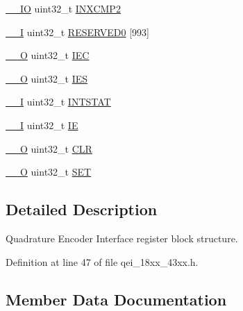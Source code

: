 \begin{DoxyCompactItemize}
\item 
\hyperlink{core__sc300_8h_aec43007d9998a0a0e01faede4133d6be}{\+\_\+\+\_\+\+IO} uint32\+\_\+t \hyperlink{struct_l_p_c___q_e_i___t_a19ba8a85129824ec0259b6733baff660}{I\+N\+X\+C\+M\+P2}
\item 
\hyperlink{core__sc300_8h_af63697ed9952cc71e1225efe205f6cd3}{\+\_\+\+\_\+I} uint32\+\_\+t \hyperlink{struct_l_p_c___q_e_i___t_a4989c1bc50afbce2d2b4e966d2c518a5}{R\+E\+S\+E\+R\+V\+E\+D0} \mbox{[}993\mbox{]}
\item 
\hyperlink{core__sc300_8h_a7e25d9380f9ef903923964322e71f2f6}{\+\_\+\+\_\+O} uint32\+\_\+t \hyperlink{struct_l_p_c___q_e_i___t_ad4164e0990c509994c19caccf1f7cf61}{I\+EC}
\item 
\hyperlink{core__sc300_8h_a7e25d9380f9ef903923964322e71f2f6}{\+\_\+\+\_\+O} uint32\+\_\+t \hyperlink{struct_l_p_c___q_e_i___t_a2eab592cbea507455a7aaab9a5ab6d53}{I\+ES}
\item 
\hyperlink{core__sc300_8h_af63697ed9952cc71e1225efe205f6cd3}{\+\_\+\+\_\+I} uint32\+\_\+t \hyperlink{struct_l_p_c___q_e_i___t_a550a4e26c5e38589e8722dc3064478a5}{I\+N\+T\+S\+T\+AT}
\item 
\hyperlink{core__sc300_8h_af63697ed9952cc71e1225efe205f6cd3}{\+\_\+\+\_\+I} uint32\+\_\+t \hyperlink{struct_l_p_c___q_e_i___t_a89eace37d24d618b12322f0479b3aefd}{IE}
\item 
\hyperlink{core__sc300_8h_a7e25d9380f9ef903923964322e71f2f6}{\+\_\+\+\_\+O} uint32\+\_\+t \hyperlink{struct_l_p_c___q_e_i___t_a909f2a48a6a21651d6baf9a3a94e6cb0}{C\+LR}
\item 
\hyperlink{core__sc300_8h_a7e25d9380f9ef903923964322e71f2f6}{\+\_\+\+\_\+O} uint32\+\_\+t \hyperlink{struct_l_p_c___q_e_i___t_a199af3383881188039525c15e18049a9}{S\+ET}
\end{DoxyCompactItemize}


\subsection{Detailed Description}
Quadrature Encoder Interface register block structure. 

Definition at line 47 of file qei\+\_\+18xx\+\_\+43xx.\+h.



\subsection{Member Data Documentation}
\mbox{\label{struct_l_p_c___q_e_i___t_a3496f3632323f5c9b09c816f57b90b2d}} 
